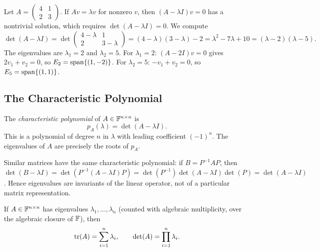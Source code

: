 \documentclass[11pt,a4paper]{article}
\begin{document}
\begin{example}
\label{ex:eigen_2x2}
Let $A = \begin{pmatrix} 4 & 1 \\ 2 & 3 \end{pmatrix}$.  If $Av = \lambda v$
for nonzero $v$, then $(A - \lambda I)v = 0$ has a nontrivial solution,
which requires $\det(A - \lambda I) = 0$.  We compute
\[
  \det(A - \lambda I)
  = \det\begin{pmatrix} 4-\lambda & 1 \\ 2 & 3-\lambda \end{pmatrix}
  = (4-\lambda)(3-\lambda) - 2 = \lambda^2 - 7\lambda + 10
  = (\lambda - 2)(\lambda - 5).
\]
The eigenvalues are $\lambda_1 = 2$ and $\lambda_2 = 5$.  For $\lambda_1 = 2$:
$(A - 2I)v = 0$ gives $2v_1 + v_2 = 0$, so $E_2 = \operatorname{span}\{(1,-2)\}$.
For $\lambda_2 = 5$: $-v_1 + v_2 = 0$, so $E_5 = \operatorname{span}\{(1,1)\}$.
\end{example}

\subsection{The Characteristic Polynomial}

\begin{definition}
\label{def:char_poly}
The \emph{characteristic polynomial} of $A \in \mathbb{F}^{n \times n}$ is
\[
  p_A(\lambda) = \det(A - \lambda I).
\]
This is a polynomial of degree $n$ in $\lambda$ with leading coefficient
$(-1)^n$.  The eigenvalues of $A$ are precisely the roots of $p_A$.
\end{definition}

\begin{remark}
\label{rem:char_poly_similarity}
Similar matrices have the same characteristic polynomial: if $B = P^{-1}AP$,
then $\det(B - \lambda I) = \det(P^{-1}(A - \lambda I)P)
= \det(P^{-1}) \det(A - \lambda I) \det(P) = \det(A - \lambda I)$.
Hence eigenvalues are invariants of the linear operator, not of a
particular matrix representation.
\end{remark}

\begin{proposition}
\label{prop:trace_det_eigen}
If $A \in \mathbb{F}^{n \times n}$ has eigenvalues $\lambda_1, \ldots, \lambda_n$
(counted with algebraic multiplicity, over the algebraic closure of $\mathbb{F}$),
then
\[
  \operatorname{tr}(A) = \sum_{i=1}^{n} \lambda_i, \qquad
  \det(A) = \prod_{i=1}^{n} \lambda_i.
\]
\end{proposition}
\end{document}

